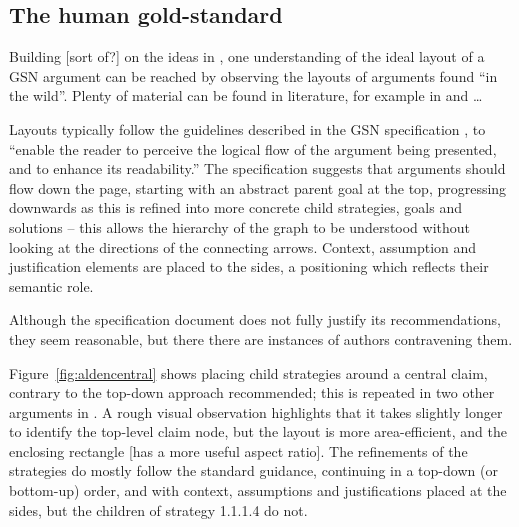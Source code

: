 \subsection{The human gold-standard }

Building [sort of?] on the ideas in \cite{5674033}, one understanding of the ideal layout of a GSN argument can be reached by observing the layouts of arguments found ``in the wild''.
Plenty of material can be found in literature, for example in \cite{Habli:2006:PPC:1183088.1183090} and  \cite{insilico} \ldots

Layouts typically follow the guidelines described in the GSN specification \citep[section~2.2, pp.~26--27]{gsnstandard}, 
to ``enable the reader to perceive the logical flow of the argument being presented, and to enhance its readability.''
The specification suggests that arguments should flow down the page, starting with an abstract parent goal at the top, progressing downwards as this is refined into more concrete child strategies, goals and solutions -- this allows the hierarchy of the graph to be understood without looking at the directions of the connecting arrows.
Context, assumption and justification elements are placed to the sides, a positioning which reflects their semantic role.

Although the specification document does not fully justify its recommendations, they seem reasonable, but there there are instances of authors contravening them.

Figure~\ref{fig:aldencentral} shows \citet{royal} placing child strategies around a central claim, contrary to the top-down approach recommended; this is repeated in two other arguments in \cite[pp.~8--9]{royal} .
A rough visual observation highlights that it takes slightly longer to identify the top-level claim node, but the layout is more area-efficient, and the enclosing rectangle  [has a more useful aspect ratio].
The refinements of the strategies do mostly follow the standard guidance, continuing in a top-down (or bottom-up) order, and with context, assumptions and justifications placed at the sides, but the children of strategy 1.1.1.4 do not.

